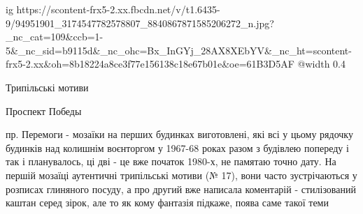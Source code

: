  
 
 
 
 

\ifcmt
  ig https://scontent-frx5-2.xx.fbcdn.net/v/t1.6435-9/94951901_3174547782578807_8840867871585206272_n.jpg?_nc_cat=109&ccb=1-5&_nc_sid=b9115d&_nc_ohc=Bx_InGYj_28AX8XEbYV&_nc_ht=scontent-frx5-2.xx&oh=8b18224a8ce3f77e156138c18e67b01e&oe=61B3D5AF
  @width 0.4
\fi

Трипільські мотиви

Проспект Победы


пр. Перемоги - мозаїки на перших будинках виготовлені, які всі у цьому рядочку
будинків над колишнім воєнторгом у 1967-68 роках разом з будівлею попереду і
так і планувалось, ці дві - це вже початок 1980-х, не памятаю точно дату. На
першій мозаїці аутентичні трипільські мотиви (№ 17), вони часто зустрічаються у
розписах глиняного посуду, а про другий вже написала коментарій - стилізований
каштан серед зірок, але то як кому фантазія підкаже, поява саме такої теми
